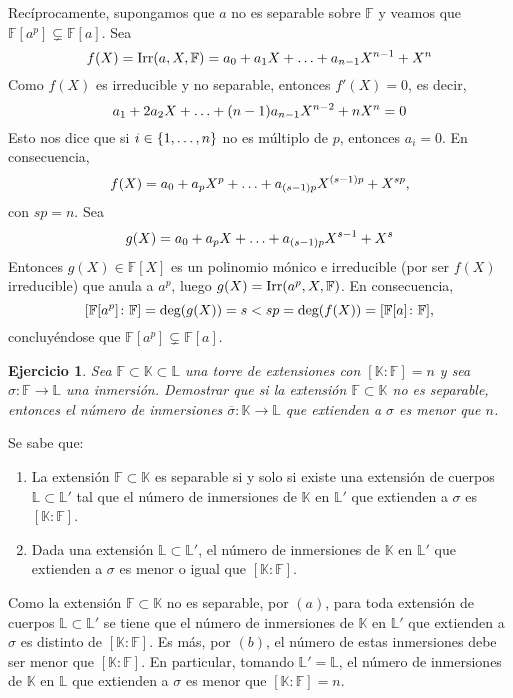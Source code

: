 \documentclass[11pt]{report}
\makeatletter
\renewenvironment{proof}[1][\proofname]{\par
  \pushQED{\qed}%
  \normalfont \topsep\z@skip %
  \trivlist
  \item[\hskip\labelsep
        \itshape
    #1\@addpunct{.}]\ignorespaces
}{%
  \popQED\endtrivlist\@endpefalse
}
\newcommand{\F}{\mathbb F}
\newcommand{\K}{\mathbb K}
\renewcommand{\L}{\mathbb L}
\newtheorem{ejercicio}{Ejercicio}
\makeatother
\begin{document}
\begin{proof}
        Recíprocamente, supongamos que $a$ no es separable sobre $\F$ y veamos que $\F[a^p] \subsetneq \F[a]$. Sea \[f(X)=\textup{Irr}(a,X,\F) = a_0+a_1X+\mathellipsis+a_{n-1}X^{n-1}+X^n\] Como $f(X)$ es irreducible y no separable, entonces $f'(X)=0$, es decir, 
        \[a_1+2a_2X+\mathellipsis+(n-1)a_{n-1}X^{n-2}+nX^n = 0\]
        Esto nos dice que si $i \in \{1,\mathellipsis,n\}$ no es múltiplo de $p$, entonces $a_i = 0$. En consecuencia,
        \[f(X)=a_0+a_{p}X^p+\mathellipsis+a_{(s-1)p}X^{(s-1)p}+X^{sp},\]
        con $sp=n$. Sea
        \[g(X) = a_0+a_pX+\mathellipsis+a_{(s-1)p}X^{s-1}+X^s\]
        Entonces $g(X) \in \F[X]$ es un polinomio mónico e irreducible (por ser $f(X)$ irreducible) que anula a $a^p$, luego $g(X)=\textup{Irr}(a^p,X,\F)$. En consecuencia, \[[\F[a^p] \colon \F] = \textup{deg}(g(X)) = s < sp = \textup{deg}(f(X)) = [\F[a] \colon \F],\] concluyéndose que $\F[a^p] \subsetneq \F[a]$.
        \end{proof}
        
\begin{ejercicio}
    Sea $\F \subset \K \subset \L$ una torre de extensiones con $[\K \colon \F] = n$ y sea $\sigma \colon \F \to \L$ una inmersión. Demostrar que si la extensión $\F \subset \K$ no es separable, entonces el número de inmersiones $\overline{\sigma} \colon \K \to \L$ que extienden a $\sigma$ es menor que $n$.
    \end{ejercicio}
    
    \begin{proof}
        Se sabe que:
        \begin{enumerate}
            \item La extensión $\F \subset \K$ es separable si y solo si existe una extensión de cuerpos $\L \subset \L'$ tal que el número de inmersiones de $ \K$ en $\L'$ que extienden a $\sigma$ es $[\K \colon \F]$.
            \item Dada una extensión $\L \subset \L'$, el número de inmersiones de $\K$ en $\L'$ que extienden a $\sigma$ es menor o igual que $[\K \colon \F]$.
        \end{enumerate}
        Como la extensión $\F \subset \K$ no es separable, por $(a)$, para toda extensión de cuerpos $\L \subset \L'$ se tiene que el número de inmersiones de $ \K$ en $\L'$ que extienden a $\sigma$ es distinto de $[\K \colon \F]$. Es más, por $(b)$, el número de estas inmersiones debe ser menor que $[\K \colon \F]$. En particular, tomando $\L'=\L$, el número de inmersiones de $ \K$ en $\L$ que extienden a $\sigma$ es menor que $[\K \colon \F] = n$.
    \end{proof}
\end{document}

